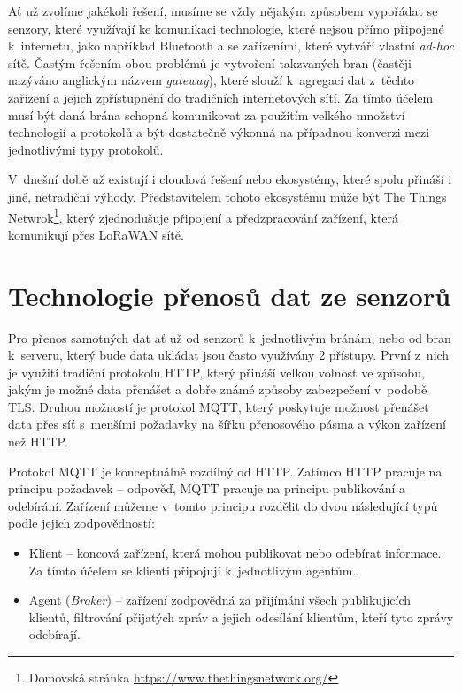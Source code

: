 Ať už zvolíme jakékoli řešení, musíme se vždy nějakým způsobem vypořádat se senzory, které využívají ke komunikaci technologie, které nejsou přímo připojené k~internetu, jako například Bluetooth a se zařízeními, které vytváří vlastní \textit{ad-hoc} sítě. Častým řešením obou problémů je vytvoření takzvaných bran \cite{zhu2010iot} (častěji nazýváno anglickým názvem \textit{gateway}), které slouží k~agregaci dat z~těchto zařízení a jejich zpřístupnění do tradičních internetových sítí. Za tímto účelem musí být daná brána schopná komunikovat za použitím velkého množství technologií a protokolů a být dostatečně výkonná na případnou konverzi mezi jednotlivými typy protokolů. 

V~dnešní době už existují i cloudová řešení nebo ekosystémy, které spolu přináší i jiné, netradiční výhody. Představitelem tohoto ekosystému může být The Things Netwrok\footnote{Domovská stránka \url{https://www.thethingsnetwork.org/}}, který zjednodušuje připojení a předzpracování zařízení, která komunikují přes LoRaWAN sítě. 

\section{Technologie přenosů dat ze senzorů} %

Pro přenos samotných dat ať už od senzorů k~jednotlivým bránám, nebo od bran k~serveru, který bude data ukládat jsou často využívány 2 přístupy. První z~nich je využití tradiční protokolu HTTP, který přináší velkou volnost ve způsobu, jakým je možné data přenášet a dobře známé způsoby zabezpečení v~podobě TLS. Druhou možností je protokol MQTT, který poskytuje možnost přenášet data přes síť s~menšími požadavky na šířku přenosového pásma a výkon zařízení \cite{7814989} než HTTP.

Protokol MQTT je konceptuálně rozdílný od HTTP. Zatímco HTTP pracuje na principu požadavek -- odpověď, MQTT pracuje na principu publikování a odebírání. Zařízení můžeme v~tomto principu rozdělit do dvou následující typů podle jejich zodpovědností:

\begin{itemize}
\item Klient -- koncová zařízení, která mohou publikovat nebo odebírat informace. Za tímto účelem se klienti připojují k~jednotlivým agentům.
\item Agent (\textit{Broker}) -- zařízení zodpovědná za přijímání všech publikujících klientů, filtrování přijatých zpráv a jejich odesílání klientům, kteří tyto zprávy odebírají.
\end{itemize}

